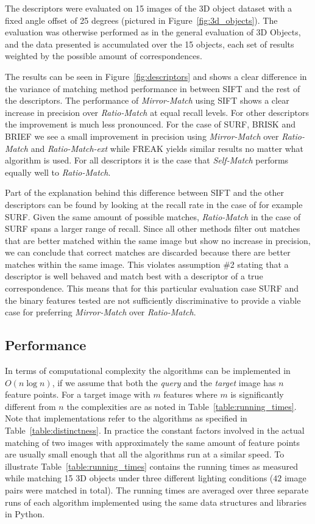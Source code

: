 \documentclass[journal]{IEEEtran}
\begin{document}
The descriptors were evaluated on 15 images of the 3D object dataset 
with a fixed angle offset of 25 degrees (pictured in 
Figure~\ref{fig:3d_objects}).  The evaluation was otherwise performed as
in the general evaluation of 3D Objects, and the data presented is 
accumulated over the 15 objects, each set of results weighted by the 
possible amount of correspondences.

The results can be seen in Figure~\ref{fig:descriptors} and shows a 
clear difference in the variance of matching method performance in 
between SIFT and the rest of the descriptors. The performance of 
\emph{Mirror-Match} using SIFT shows a clear increase in precision over 
\emph{Ratio-Match} at equal recall levels. For other descriptors the 
improvement is much less pronounced.  For the case of SURF, BRISK and 
BRIEF we see a small improvement in precision using \emph{Mirror-Match} 
over \emph{Ratio-Match} and \emph{Ratio-Match-ext} while FREAK yields 
similar results no matter what algorithm is used. For all descriptors it 
is the case that \emph{Self-Match} performs equally well to 
\emph{Ratio-Match}.

Part of the explanation behind this difference between SIFT and the 
other descriptors can be found by looking at the recall rate in the case
of for example SURF\@. Given the same amount of possible matches, 
\emph{Ratio-Match} in the case of SURF spans a larger range of recall.  
Since all other methods filter out matches that are better matched 
within the same image but show no increase in precision, we can conclude 
that correct matches are discarded because there are better matches 
within the same image. This violates assumption \#2 stating that a 
descriptor is well behaved and match best with a descriptor of a true 
correspondence. This means that for this particular evaluation case SURF 
and the binary features tested are not sufficiently discriminative to 
provide a viable case for preferring \emph{Mirror-Match} over 
\emph{Ratio-Match}.

\subsection{Performance}

In terms of computational complexity the algorithms can be implemented 
in $O(n\log n)$, if we assume that both the \emph{query} and the 
\emph{target} image has $n$ feature points. For a target image with $m$ 
features where $m$ is significantly different from $n$ the complexities 
are as noted in Table~\ref{table:running_times}. Note that 
implementations refer to the algorithms as specified in 
Table~\ref{table:distinctness}. In practice the constant factors 
involved in the actual matching of two images with approximately the 
same amount of feature points are usually small enough that all the 
algorithms run at a similar speed. To illustrate 
Table~\ref{table:running_times} contains the running times as measured 
while matching 15 3D objects under three different lighting conditions 
($42$ image pairs were matched in total). The running times are averaged 
over three separate runs of each algorithm implemented using the same 
data structures and libraries in Python. 
\end{document}
